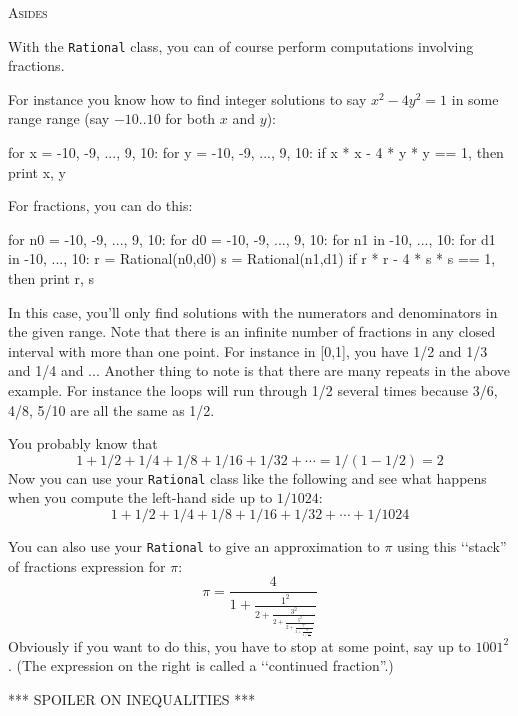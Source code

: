 {\textsc{Asides}

With the \texttt{Rational} class,
you can of course perform computations involving fractions.

For instance you know how to find integer solutions to say
$x^2 - 4y^2 = 1$ in some range range (say $-10..10$ for both $x$ and $y$):
\begin{console}
for x = -10, -9, ..., 9, 10:
    for y = -10, -9, ..., 9, 10:
        if x * x - 4 * y * y == 1, then print x, y
\end{console}
For fractions, you can do this:
\begin{console}[commandchars=\\\{\}]
for n0 = -10, -9, ..., 9, 10:
    for d0 = -10, -9, ..., 9, 10:
        for n1 in -10, ..., 10:
            for d1 in -10, ..., 10:
                r = Rational(n0,d0)
                s = Rational(n1,d1)
                if r * r - 4 * s * s == 1, then print r, s
\end{console}
In this case, you'll only find solutions with the numerators and
denominators in the given range.
Note that there is an infinite number of fractions
in any closed interval with more than one point.
For instance in [0,1],
you have 1/2 and 1/3 and 1/4 and ...
Another thing to note is that there are many repeats
in the above example.
For instance the loops will run
through 1/2 several times because 3/6, 4/8, 5/10 are all the same as 1/2.

You probably know that
\[
	1 + 1/2 + 1/4 + 1/8 + 1/16 + 1/32 + \cdots = 1 / (1 - 1/2) = 2
\]
Now you can use your \texttt{Rational} class like the following and see
what happens when you compute the left-hand side up to $1/1024$:
\[
1 + 1/2 + 1/4 + 1/8 + 1/16 + 1/32 + \cdots + 1/1024
\]

You can also use your \texttt{Rational} to give an approximation to
$\pi$ using this \lq\lq stack'' of fractions expression for $\pi$:
\[
\pi
=
\frac{4}
{
  1 + 
  \frac{1^2}
  {
    2 +
    \frac{3^2}
    {
      2 +
      \frac{5^2}
      {
        2 +
        \frac{7^2}
        {
          2 +
          \frac{9^2}
          {
            2 + \frac{11^2}{\ddots}
          }
        }
      }
    }
  }
}
\]
Obviously if you want to do this, you have to stop at some point, say up to
$1001^2$. (The expression on the right is called a
\lq\lq continued fraction''.)


\newpage
\textsc{*** SPOILER ON INEQUALITIES ***}

}
